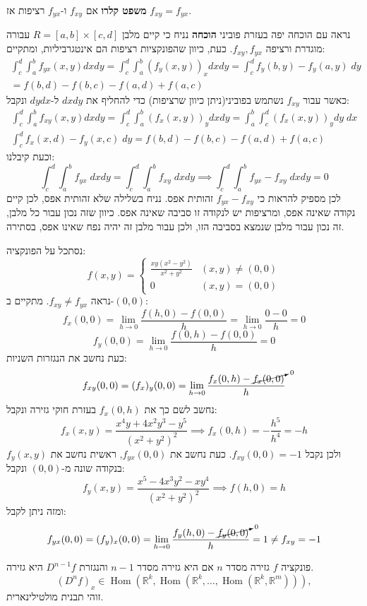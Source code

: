 \documentclass{tstextbook}
\begin{document}
\textbf{משפט קלרו}
אם \(f_{xy}\) ו-\(f_{yx}\) רציפות אז \(f_{xy}=f_{yx}\).

נראה עם הוכחה יפה בעזרת פוביני
\textbf{הוכחה}
נניח כי קיים מלבן \(R=[a,b]\times[c,d]\) עבורה מוגדרת ורציפה \(f_{xy},f_{yx}\). כעת, כיוון שהפונקציות רציפות הם אינטגרביליות, ומתקיים:
$$\begin{gather}\int_c^d \!\!\!\int_{a}^b f_{yx}(x,y)dxdy=\int_{c}^d \!\!\!\int_{a}^b(f_{y}(x,y))_{x}dxdy=\int_{c}^d f_{y}(b,y)-f_{y}(a,y)\;dy \\=f(b,d)-f(b,c)-f(a,d)+f(a,c)  
\end{gather}$$
כאשר עבור \(f_{xy}\) נשתמש בפוביני(ניתן כיוון שרציפות) כדי להחליף את \(dxdy\) ל-\(dydx\) ונקבל:
$$\begin{gather}\int_c^d \!\!\!\int_{a}^b f_{xy}(x,y)dxdy=\int_{c}^d \!\!\!\int_{a}^b(f_{x}(x,y))_{y}dxdy= \int_{a}^b \int_{c}^d (f_{x}(x,y))_{y} dy\;dx\\\int_{c}^d f_{x}(x,d)-f_{y}(x,c)\;dy=f(b,d)-f(b,c)-f(a,d)+f(a,c)
\end{gather}$$
וכעת קיבלנו:
$$\int_c^d \!\!\!\int_{a}^b \!\!f_{yx}\;dxdy=\int_c^d \!\!\!\int_{a}^b \!\!f_{xy}\;dxdy\implies \int_c^d \!\!\!\int_{a}^b \!f_{yx}-f_{xy}\;dxdy=0$$
לכן מספיק להראות כי \(f_{yx}-f_{xy}\) זהותית אפס. נניח בשלילה שלא זהותית אפס, לכן קיים נקודה שאינה אפס, ומרציפות יש לנקודה זו סביבה שאינה אפס. כיוון שזה נכון עבור כל מלבן, זה נכון עבור מלבן שנמצא בסביבה הזו, ולכן עבור מלבן זה יהיה נפח שאינו אפס, בסתירה.

\begin{example}
נסתכל על הפונקציה:
$$f(x,y)=\begin{cases}\frac{xy(x^2-y^2)}{x^2+y^2} & (x,y)\neq(0,0) \\0 & (x,y)=(0,0)
\end{cases}$$
נראה \(f_{xy}\neq f_{yx}\). מתקיים ב-\((0,0)\):
$$f_{x}(0,0)=\lim_{ h \to 0 } \frac{f(h,0)-f(0,0)}{h}=\lim_{ h \to 0 } \frac{0-0}{h}=0$$$$f_{y}(0,0)=\lim_{ h \to 0 } \frac{f(0,h)-f(0,0)}{h}=0$$
כעת נחשב את הנגזרות השניות:
$$f_{xy}(0,0)=(f_{x})_{y}(0,0)=\lim_{ h \to 0 } \frac{f_{x}(0,h)-\cancelto{ 0 }{ f_{x}(0,0) }}{h}$$
נחשב לשם כך את \(f_{x}(0,h)\) בעזרת חוקי גזירה ונקבל:
$$f_{x}(x,y)= \frac{x^4y+4x^2y^3-y^5}{(x^2+y^2)^2}\implies f_{x}(0,h)=-\frac{h^5}{h^4}=-h$$
ולכן נקבל \(f_{xy}(0,0)=-1\). כעת נחשב את \(f_{yx}(0,0)\), ראשית נחשב את \(f_{y}(x,y)\) בנקודה שונה מ-\((0,0)\) ונקבל:
$$f_{y}(x,y)= \frac{x^5-4x^3y^2-xy^4}{(x^2+y^2)^2}\implies f(h,0)=h$$
ומזה ניתן לקבל:
$$f_{yx}(0,0)=(f_{y})_{x}(0,0)=\lim_{ h \to 0 } \frac{f_{y}(h,0)-\cancelto{ 0 }{ f_{y}(0,0) }}{h}=1\neq f_{xy}=-1$$

\end{example}
\begin{definition}
פונקציה \(f\) גזירה מסדר \(n\) אם היא גזירה מסדר \(n-1\) והנגזרת \(D^{n-1}f\) היא גזירה. $$(D^{n}f)_{x}\in\operatorname{Hom}(\mathbb{R}^{k},\operatorname{Hom}(\mathbb{R}^{k},\dots,\operatorname{Hom}(\mathbb{R}^{k},\mathbb{R}^{m}))),$$
זוהי תבנית מולטילינארית.

\end{definition}
\end{document}
